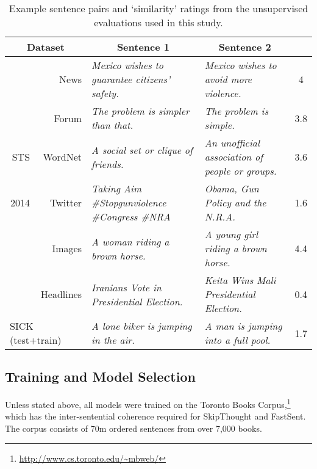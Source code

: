 \documentclass[11pt,letterpaper]{article}
\begin{document}
\begin{table*}[ht]
\begin{adjustwidth}{-0.6cm}{}
\renewcommand{\tabcolsep}{4.6pt}
\small
\newcommand{\mc}[1]{\multicolumn{1}{l|}{#1}}
  \begin{center}

      {
        \begin{tabular}{rr|l|l|c}
          \multicolumn{2}{c|}{Dataset} & \multicolumn{1}{c}{Sentence 1} &\multicolumn{1}{|c|}{Sentence 2} &   \\
          \hline
          \hline
           & News &  \emph{Mexico wishes to guarantee citizens' safety.} &\emph{Mexico wishes to avoid more violence.} & 4 \\
           & Forum &  \emph{The problem is simpler than that.} &  \emph{The problem is simple.}  & 3.8 \\
           STS & WordNet &  \emph{A social set or clique of friends.} &  \emph{An unofficial association of people or groups.} & 3.6 \\
           2014 & Twitter & \emph{Taking Aim  \#Stopgunviolence \#Congress \#NRA} & \emph{Obama, Gun Policy and the N.R.A.}  & 1.6 \\
            & Images & \emph{A woman riding a brown horse.} &  \emph{A young girl riding a brown horse.} & 4.4 \\
           & Headlines &  \emph{Iranians Vote in Presidential Election.} &  \emph{Keita Wins Mali Presidential Election.} & 0.4  \\
          \hline
          \multicolumn{2}{l|}{SICK (test+train)} & \emph{A lone biker is jumping in the air.} & \emph{A man is jumping into a full pool.}  & 1.7 \\
          \hline 
        \end{tabular}

    }
    \caption{\label{unsex} Example sentence pairs and `similarity' ratings from the unsupervised evaluations used in this study.}
  \end{center}
  \vspace*{-4ex}
  \end{adjustwidth}
\end{table*}

\subsection{Training and Model Selection}



Unless stated above, all models were trained on the Toronto Books Corpus,\footnote{\scriptsize \url{http://www.cs.toronto.edu/~mbweb/}} which has the inter-sentential coherence required for SkipThought and FastSent. The corpus consists of 70m ordered sentences from over 7,000 books. 
\end{document}

